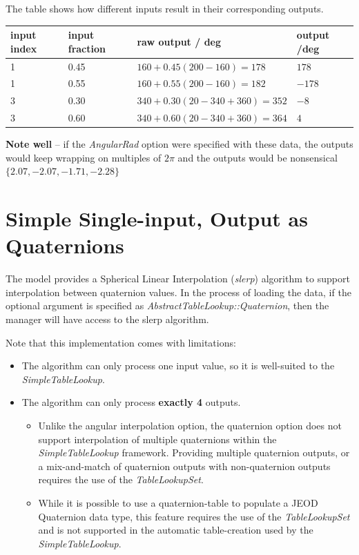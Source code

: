 \documentclass[11pt,fleqn]{report}
\begin{document}
 The table shows how different inputs result in their corresponding outputs.
 \begin{center}
\begin{tabular}{|l|l|l|l|}
\hline
\textbf{input index} & \textbf{input fraction} & \textbf{raw output / deg} &
 \textbf{output /deg}\\
\hline
1 & 0.45 & $160 + 0.45 (200-160) = 178$ & $178$\\
1 & 0.55 & $160 + 0.55 (200-160) = 182$ & $-178$\\
3 & 0.30 & $340 + 0.30 (20-340+360) = 352$ & $-8$\\
3 & 0.60 & $340 + 0.60 (20-340+360) = 364$ & $4$\\
\hline
 \end{tabular}
 \end{center}

\textbf{Note well} -- if the \textit{AngularRad} option were specified
 with these data, the outputs would keep wrapping on multiples of $2\pi$
 and the outputs would be nonsensical $\{2.07, -2.07, -1.71, -2.28\}$

\section{Simple Single-input, Output as Quaternions}
The model provides a Spherical Linear Interpolation (\textit{slerp}) algorithm
to support interpolation between quaternion values.  In the process of loading
the data, if the optional argument is specified as
\textit{AbstractTableLookup::Quaternion}, then the manager will have access to
the slerp algorithm.

Note that this implementation comes with limitations:
\begin{itemize}
 \item The algorithm can only process one input value, so it is well-suited to
 the \textit{SimpleTableLookup}.
 \item The algorithm can only process \textbf{exactly 4} outputs.
 \begin{itemize}
  \item Unlike the angular interpolation option, the quaternion option does
        not support interpolation of multiple quaternions within the
        \textit{SimpleTableLookup} framework.  Providing multiple quaternion
        outputs, or a mix-and-match of quaternion outputs with non-quaternion
        outputs requires the use of the \textit{TableLookupSet}.
  \item While it is possible to use a quaternion-table to populate a JEOD
        Quaternion data type, this feature requires the use of the
        \textit{TableLookupSet} and is not supported in the automatic
        table-creation used by the \textit{SimpleTableLookup}.
 \end{itemize}
\end{itemize}
\end{document}
